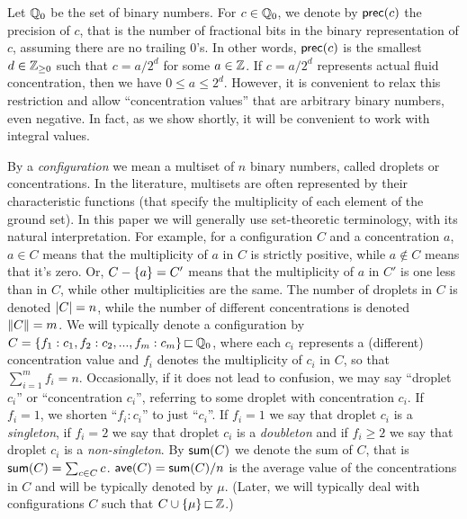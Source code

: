 

%

Let ${\mathbb Q}_0$ be the set of  binary numbers.
For $c\in{\mathbb Q}_0$, we denote by ${\textsf{prec}}(c)$ the precision of $c$, that is the
number of fractional bits in the binary representation of $c$, assuming there are no trailing $0$'s.
In other words, ${\textsf{prec}}(c)$ is the smallest $d\in{\mathbb{Z}_{\ge 0}}$ such that $c = a/2^d$ for some $a\in{\mathbb Z}$. 
If $c = a/2^d$ represents actual fluid concentration, then we have $0\le a \le 2^d$. However,  
it is convenient to relax this restriction and allow ``concentration values'' that are
arbitrary binary numbers, even negative. In fact, as we show shortly, 
it will be convenient to work with integral values.

By a \emph{configuration} we mean a multiset of $n$ binary numbers, called droplets or concentrations.
In the literature, multisets are often represented by their characteristic functions (that specify
the multiplicity of each element of the ground set). In this paper we will generally use set-theoretic
terminology, with its natural interpretation. For example, for a configuration $C$ and a concentration $a$, 
$a\in C$ means that the multiplicity of $a$ in $C$ is strictly positive, while $a\notin C$ means that it's zero.
Or, $C - { \left\{ a \right\} } = C'$ means that the multiplicity of $a$ in $C'$ is one less than in $C$, while
other multiplicities are the same.
The number of droplets in $C$ is denoted ${|C|}=n$, 
while the number of different concentrations is denoted ${\|C\|}=m$.
We will typically denote a configuration by
$C = { \left\{ f_1:c_1,f_2: c_2,...,f_m:c_m \right\} } {\,\sqsubset\,} {\mathbb Q}_0$, where each $c_i$ represents
a (different) concentration value and $f_i$ denotes the
multiplicity of $c_i$ in $C$, so that $\sum_{i=1}^m f_i = n$. 
Occasionally, if it does not lead to confusion, we may say
``droplet $c_i$'' or ``concentration $c_i$'', referring to some droplet with concentration $c_i$.
If $f_i=1$, we shorten ``$f_i:c_i$'' to just ``$c_i$''.
If $f_i = 1$ we say that droplet $c_i$ is a \emph{singleton}, 
if $f_i = 2$ we say that droplet $c_i$ is a \emph{doubleton}
and if $f_i\geq 2$ we say that droplet $c_i$ is a \emph{non-singleton}.
By ${\textsf{sum}}(C)$ we denote the sum of $C$, that is ${\textsf{sum}}(C) = \sum_{c\in C} c$.
${\textsf{ave}}(C) = {\textsf{sum}}(C)/n$ is the average value of the concentrations in $C$ and will
be typically denoted by $\mu$.
(Later, we will typically deal with configurations $C$ such that
$C\cup{ \left\{ \mu \right\} }{\,\sqsubset\,}{\mathbb Z}$.)


